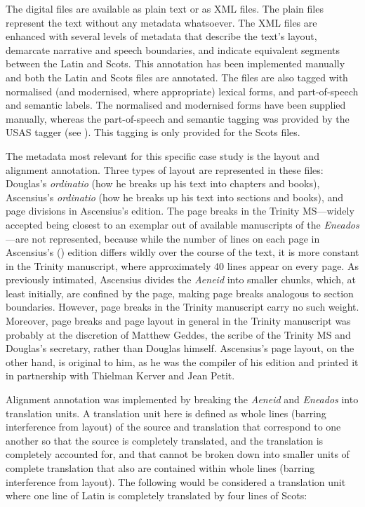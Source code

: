 \documentclass{dhbenelux}
\begin{document}
The digital files are available as plain text or as XML files. The plain
files represent the text without any metadata whatsoever. The XML files
are enhanced with several levels of metadata that describe the text's
layout, demarcate narrative and speech boundaries, and indicate
equivalent segments between the Latin and Scots. This annotation has
been implemented manually and both the Latin and Scots files are
annotated. The files are also tagged with normalised (and modernised,
where appropriate) lexical forms, and part-of-speech and semantic
labels. The normalised and modernised forms have been supplied manually,
whereas the part-of-speech and semantic tagging was provided by the USAS
tagger (see \citeauthor{archer2003} \citeyear{archer2003}). This tagging is only provided for the Scots files.

The metadata most relevant for this specific case study is the layout
and alignment annotation. Three types of layout are represented in these
files: Douglas's \emph{ordinatio} (how he breaks up his text into
chapters and books), Ascensius's \emph{ordinatio} (how he breaks up his
text into sections and books), and page divisions in Ascensius's
edition. The page breaks in the Trinity MS---widely accepted being
closest to an exemplar out of available manuscripts of the
\emph{Eneados}---are not represented, because while the number of lines
on each page in Ascensius's (\citeyear{virgil1501}) edition differs wildly over the course of
the text, it is more constant in the Trinity manuscript, where
approximately 40 lines appear on every page. As previously intimated,
Ascensius divides the \emph{Aeneid} into smaller chunks, which, at least
initially, are confined by the page, making page breaks analogous to
section boundaries. However, page breaks in the Trinity manuscript carry
no such weight. Moreover, page breaks and page layout in general in the
Trinity manuscript was probably at the discretion of Matthew Geddes, the
scribe of the Trinity MS and Douglas's secretary, rather than Douglas
himself. Ascensius's page layout, on the other hand, is original to him,
as he was the compiler of his edition and printed it in partnership with
Thielman Kerver and Jean Petit.

Alignment annotation was implemented by breaking the \emph{Aeneid} and
\emph{Eneados} into translation units. A translation unit here is
defined as whole lines (barring interference from layout) of the source
and translation that correspond to one another so that the source is
completely translated, and the translation is completely accounted for,
and that cannot be broken down into smaller units of complete
translation that also are contained within whole lines (barring
interference from layout). The following would be considered a
translation unit where one line of Latin is completely translated by
four lines of Scots:
\end{document}
